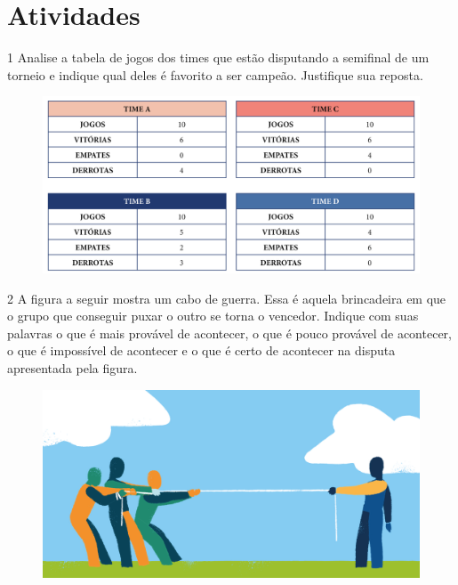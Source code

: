 \section*{Atividades}

\num{1} Analise a tabela de jogos dos times que estão disputando a semifinal de um
torneio e indique qual deles é favorito a ser campeão. Justifique sua reposta.

\begin{figure}[htpb!]
\begin{center}
\includegraphics[width=.8\textwidth]{./media/image85.png}
\end{center}
\end{figure}

\vspace{-1em}


\num{2} A figura a seguir mostra um cabo de guerra. Essa é aquela brincadeira em
que o grupo que conseguir puxar o outro se torna o vencedor. Indique com
suas palavras o que é mais provável de acontecer, o que é pouco provável
de acontecer, o que é impossível de acontecer e o que é certo de
acontecer na disputa apresentada pela figura.


\begin{figure}[htpb!]
\includegraphics[width=\textwidth]{./media/image86.png}
\end{figure}

